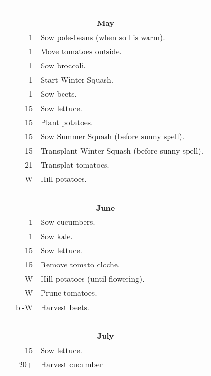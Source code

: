 \documentclass{article}
\begin{document}
\begin{longtable}{r|r|l}
	& & \\ \hline
	& & \\ \hline
	& & \\ \hline
	& & \\ \hline
	& & \\ \hline
	\multicolumn{3}{c}{\textbf{May}} \\ \hline
	& 1 & Sow pole-beans (when soil is warm). \\ \hline
	& 1 & Move tomatoes outside. \\ \hline
	& 1 & Sow broccoli. \\ \hline
	& 1 & Start Winter Squash. \\ \hline
	& 1 & Sow beets. \\ \hline
	& 15 & Sow lettuce. \\ \hline
	& 15 & Plant potatoes. \\ \hline
	& 15 & Sow Summer Squash (before sunny spell). \\ \hline
	& 15 & Transplant Winter Squash (before sunny spell). \\ \hline
	& 21 & Transplat tomatoes. \\ \hline
	& W & Hill potatoes. \\ \hline
	& & \\ \hline
	& & \\ \hline
	& & \\ \hline
	& & \\ \hline
	& & \\ \hline
	\multicolumn{3}{c}{\textbf{June}} \\ \hline
	& 1 & Sow cucumbers. \\ \hline
	& 1 & Sow kale. \\ \hline
	& 15 & Sow lettuce. \\ \hline
	& 15 & Remove tomato cloche. \\ \hline
	& W & Hill potatoes (until flowering). \\ \hline
	& W & Prune tomatoes. \\ \hline
	& bi-W & Harvest beets. \\ \hline
	& & \\ \hline
	& & \\ \hline
	& & \\ \hline
	& & \\ \hline
	& & \\ \hline
	\multicolumn{3}{c}{\textbf{July}} \\ \hline
	& 15 & Sow lettuce. \\ \hline
	& 20+ & Harvest cucumber \\ \hline

\end{longtable}
\end{document}
